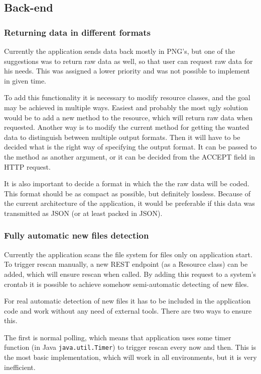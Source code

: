 \documentclass[11pt,a4paper,titlepage,oneside]{report}
\begin{document}
\subsection{Back-end}

\subsubsection{Returning data in different formats}
Currently the application sends data back mostly in \gls{PNG}'s, but one of the suggestions was to return raw data as well, so that user can request raw data for his needs. This was assigned a lower priority and was not possible to implement in given time.

To add this functionality it is necessary to modify resource classes, and the goal may be achieved in multiple ways. Easiest and probably the most ugly solution would be to add a new method to the resource, which will return raw data when requested. Another way is to modify the current method for getting the wanted data to distinguish between multiple output formats. Then it will have to be decided what is the right way of specifying the output format. It can be passed to the method as another argument, or it can be decided from the ACCEPT field in HTTP request.

It is also important to decide a format in which the the raw data will be coded. This format should be as compact as possible, but definitely lossless. Because of the current architecture of the application, it would be preferable if this data was transmitted as JSON (or at least packed in JSON).

\subsubsection{Fully automatic new files detection}
Currently the application scans the file system for files only on application start. To trigger rescan manually, a new REST endpoint (as a Resource class) can be added, which will ensure rescan when called. By adding this request to a system's crontab it is possible to achieve somehow semi-automatic detecting of new files.

For real automatic detection of new files it has to be included in the application code and work without any need of external tools. There are two ways to ensure this.

The first is normal polling, which means that application uses some timer function (in Java \texttt{java.util.Timer}) to trigger rescan every now and then. This is the most basic implementation, which will work in all environments, but it is very inefficient.
\end{document}
